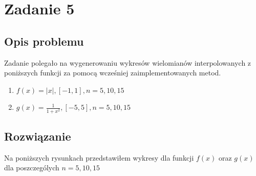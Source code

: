 \section{Zadanie 5}
\subsection{Opis problemu}
Zadanie polegało na wygenerowaniu wykresów wielomianów interpolowanych z poniższych funkcji za pomocą wcześniej zaimplementowanych metod.
\begin{enumerate}
  \item $f(x) = |x|, [-1, 1], n = 5, 10, 15$
  \item $g(x) = \frac{1}{1 + x^2}, [-5, 5], n = 5, 10, 15$
\end{enumerate}
\subsection{Rozwiązanie}
Na poniższych rysunkach przedstawiłem wykresy dla funkcji $f(x)$ oraz $g(x)$ dla poszczególych $n = 5, 10, 15$ 
